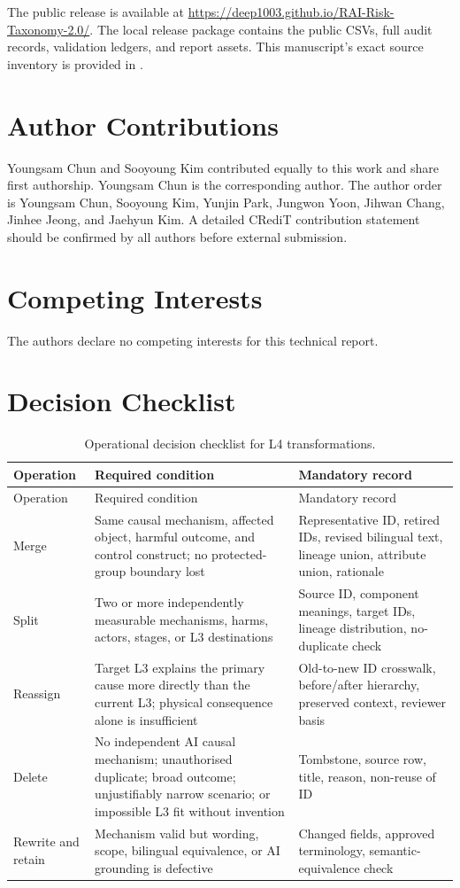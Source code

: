 \documentclass[10pt,a4paper]{article}
\newcommand{\code}[1]{\texttt{\small\detokenize{#1}}}
\begin{document}
The public release is available at \url{https://deep1003.github.io/RAI-Risk-Taxonomy-2.0/}. The local release package contains the public CSVs, full audit records, validation ledgers, and report assets. This manuscript's exact source inventory is provided in \code{source_inventory.csv}.

\section*{Author Contributions}

Youngsam Chun and Sooyoung Kim contributed equally to this work and share first authorship. Youngsam Chun is the corresponding author. The author order is Youngsam Chun, Sooyoung Kim, Yunjin Park, Jungwon Yoon, Jihwan Chang, Jinhee Jeong, and Jaehyun Kim. A detailed CRediT contribution statement should be confirmed by all authors before external submission.

\section*{Competing Interests}

The authors declare no competing interests for this technical report.

\appendix
\section{Decision Checklist}

\begin{longtable}{L{0.16\textwidth}L{0.36\textwidth}L{0.38\textwidth}}
\caption{Operational decision checklist for L4 transformations.}\label{tab:checklist}\\
\toprule
Operation & Required condition & Mandatory record \\
\midrule
\endfirsthead
\toprule
Operation & Required condition & Mandatory record \\
\midrule
\endhead
Merge & Same causal mechanism, affected object, harmful outcome, and control construct; no protected-group boundary lost & Representative ID, retired IDs, revised bilingual text, lineage union, attribute union, rationale \\
Split & Two or more independently measurable mechanisms, harms, actors, stages, or L3 destinations & Source ID, component meanings, target IDs, lineage distribution, no-duplicate check \\
Reassign & Target L3 explains the primary cause more directly than the current L3; physical consequence alone is insufficient & Old-to-new ID crosswalk, before/after hierarchy, preserved context, reviewer basis \\
Delete & No independent AI causal mechanism; unauthorised duplicate; broad outcome; unjustifiably narrow scenario; or impossible L3 fit without invention & Tombstone, source row, title, reason, non-reuse of ID \\
Rewrite and retain & Mechanism valid but wording, scope, bilingual equivalence, or AI grounding is defective & Changed fields, approved terminology, semantic-equivalence check \\
\bottomrule
\end{longtable}
\end{document}
